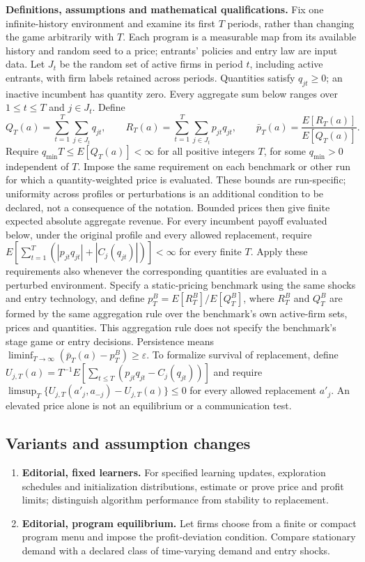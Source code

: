 \documentclass[11pt,a4paper]{article}
\begin{document}
\textbf{Definitions, assumptions and mathematical qualifications.} Fix one infinite-history environment and examine its first \(T\) periods, rather than changing the game arbitrarily with \(T\). Each program is a measurable map from its available history and random seed to a price; entrants' policies and entry law are input data. Let \(J_t\) be the random set of active firms in period \(t\), including active entrants, with firm labels retained across periods. Quantities satisfy \(q_{jt}\geq0\); an inactive incumbent has quantity zero. Every aggregate sum below ranges over \(1\leq t\leq T\) and \(j\in J_t\). Define
\[
 Q_T(a)=\sum_{t=1}^T\sum_{j\in J_t}q_{jt},\qquad
 R_T(a)=\sum_{t=1}^T\sum_{j\in J_t}p_{jt}q_{jt},\qquad
 \bar p_T(a)=\frac{E[R_T(a)]}{E[Q_T(a)]}.
\]
Require \(q_{\min}T\leq E[Q_T(a)]<\infty\) for all positive integers \(T\), for some \(q_{\min}>0\) independent of \(T\). Impose the same requirement on each benchmark or other run for which a quantity-weighted price is evaluated. These bounds are run-specific; uniformity across profiles or perturbations is an additional condition to be declared, not a consequence of the notation. Bounded prices then give finite expected absolute aggregate revenue. For every incumbent payoff evaluated below, under the original profile and every allowed replacement, require \(E[\sum_{t=1}^T(|p_{jt}q_{jt}|+|C_j(q_{jt})|)]<\infty\) for every finite \(T\). Apply these requirements also whenever the corresponding quantities are evaluated in a perturbed environment. Specify a static-pricing benchmark using the same shocks and entry technology, and define \(p_T^B=E[R_T^B]/E[Q_T^B]\), where \(R_T^B\) and \(Q_T^B\) are formed by the same aggregation rule over the benchmark's own active-firm sets, prices and quantities. This aggregation rule does not specify the benchmark's stage game or entry decisions. Persistence means \(\liminf_{T\to\infty}(\bar p_T(a)-p_T^B)\geq\varepsilon\). To formalize survival of replacement, define \(U_{j,T}(a)=T^{-1}E[\sum_{t\leq T}(p_{jt}q_{jt}-C_j(q_{jt}))]\) and require \(\limsup_T\{U_{j,T}(a'_j,a_{-j})-U_{j,T}(a)\}\leq0\) for every allowed replacement \(a'_j\). An elevated price alone is not an equilibrium or a communication test.
\subsection*{Variants and assumption changes}
\begin{enumerate}
\item \textbf{Editorial, fixed learners.} For specified learning updates, exploration schedules and initialization distributions, estimate or prove price and profit limits; distinguish algorithm performance from stability to replacement.
\item \textbf{Editorial, program equilibrium.} Let firms choose from a finite or compact program menu and impose the profit-deviation condition. Compare stationary demand with a declared class of time-varying demand and entry shocks.
\end{enumerate}
\end{document}

